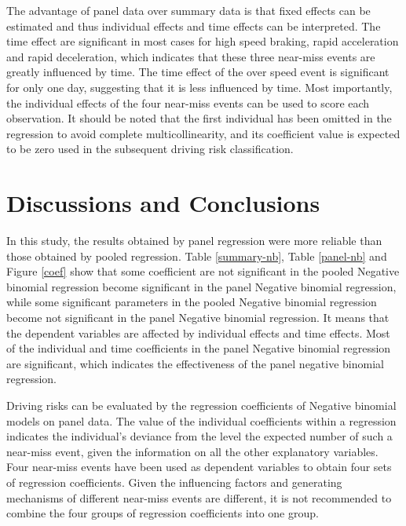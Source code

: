 \documentclass[num-refs]{wiley-article}
\begin{document}
The advantage of panel data over summary data is that fixed effects can be estimated and thus individual effects and time effects can be interpreted. The time effect are significant in most cases for high speed braking, rapid acceleration and rapid deceleration, which indicates that these three near-miss events are greatly influenced by time. The time effect of the over speed event is significant for only one day, suggesting that it is less influenced by time. Most importantly, the individual effects of the four near-miss events can be used to score each observation. It should be noted that the first individual has been omitted in the regression to avoid complete multicollinearity, and its coefficient value is expected to be zero used in the subsequent driving risk classification.
\section{Discussions and Conclusions}

In this study, the results obtained by panel regression were more reliable than those obtained by pooled regression. Table \ref{summary-nb}, Table \ref{panel-nb} and Figure \ref{coef} show that some coefficient are not significant in the pooled Negative binomial regression become significant in the panel Negative binomial regression, while some significant parameters in the pooled Negative binomial regression become not significant in the panel Negative binomial regression. It means that the dependent variables are affected by individual effects and time effects. Most of the individual and time coefficients in the panel Negative binomial regression are significant, which indicates the effectiveness of the panel negative binomial regression. 

Driving risks can be evaluated by the regression coefficients of Negative binomial models on panel data. The value of the individual coefficients within a regression indicates the individual's deviance from the level the expected number of  such a near-miss event, given the information on all the other explanatory variables. Four near-miss events have been used as dependent variables to obtain four sets of regression coefficients. Given the influencing factors and generating mechanisms of different near-miss events are different, it is not recommended to combine the four groups of regression coefficients into one group.
\end{document}
